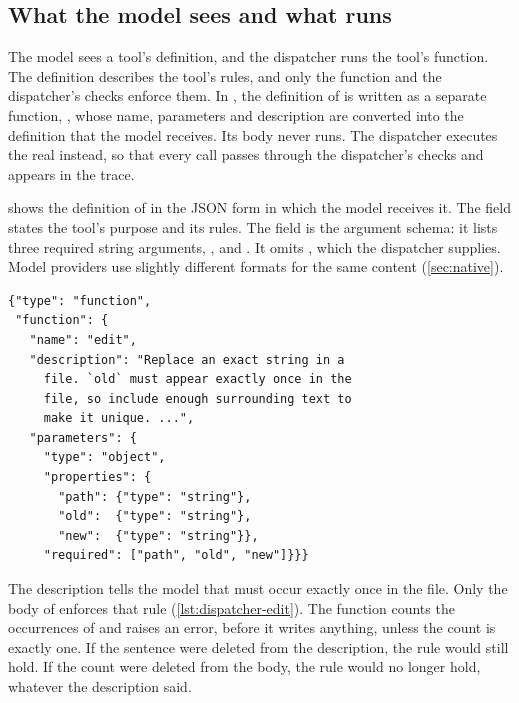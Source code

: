 \subsection{What the model sees and what runs}
\label{sec:dispatcher-definition}

The model sees a tool's definition, and the dispatcher runs the tool's function. The definition
describes the tool's rules, and only the function and the dispatcher's checks enforce them. In
\msa{}, the definition of  is written as a
separate function, , whose name, parameters and description are converted
into the definition that the model receives. Its body never runs. The dispatcher executes the real
 instead, so that every call passes through the dispatcher's checks and appears in the
trace.

 shows the definition of  in the JSON form in which the
model receives it. The  field states the tool's purpose and its rules. The
 field is the argument schema: it lists three required string arguments,
,  and . It omits , which the dispatcher
supplies. Model providers use slightly
different formats for the same content (\cref{sec:native}).

\begin{lstlisting}[float=tbp, basicstyle=\ttfamily\footnotesize, caption={Illustrative code: the definition of \demoref{edit} as the model receives it, abbreviated.}, label=lst:dispatcher-schema]
{"type": "function",
 "function": {
   "name": "edit",
   "description": "Replace an exact string in a
     file. `old` must appear exactly once in the
     file, so include enough surrounding text to
     make it unique. ...",
   "parameters": {
     "type": "object",
     "properties": {
       "path": {"type": "string"},
       "old":  {"type": "string"},
       "new":  {"type": "string"}},
     "required": ["path", "old", "new"]}}}
\end{lstlisting}

The description tells the model that  must occur exactly once in the file. Only the
body of  enforces that rule (\cref{lst:dispatcher-edit}). The function counts the
occurrences of  and raises an error, before it writes anything, unless the count is
exactly one. If the sentence were deleted from the description, the rule would still hold. If the
count were deleted from the body, the rule would no longer hold, whatever the description said.

